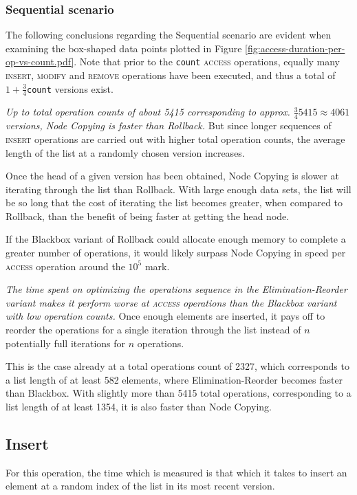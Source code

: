 \subsubsection{Sequential scenario}
The following conclusions regarding the Sequential scenario are evident when
examining the box-shaped data points plotted in Figure
\ref{fig:access-duration-per-op-vs-count.pdf}. Note that prior to the
\texttt{count} \textsc{access} operations, equally many \textsc{insert},
\textsc{modify} and \textsc{remove} operations have been executed, and thus a
total of $1+\frac{3}{4}$\texttt{count} versions exist.

\textit{Up to total operation counts of about 5415 corresponding to approx.
$\frac{3}{4}5415 \approx 4061$ versions, Node Copying is faster than Rollback.}
But since longer sequences of \textsc{insert} operations are carried out with
higher total operation counts, the average length of the list at a randomly
chosen version increases.

Once the head of a given version has been obtained, Node Copying is slower at
iterating through the list than Rollback. With large enough data sets, the list
will be so long that the cost of iterating the list becomes greater, when
compared to Rollback, than the benefit of being faster at getting the head node.

If the Blackbox variant of Rollback could allocate enough memory to complete a
greater number of operations, it would likely surpass Node Copying in speed per
\textsc{access} operation around the $10^5$ mark.

\textit{The time spent on optimizing the operations sequence in the
Elimination-Reorder variant makes it perform worse at \textsc{access} operations
than the Blackbox variant with low operation counts.} Once enough elements are
inserted, it pays off to reorder the operations for a single iteration through
the list instead of $n$ potentially full iterations for $n$ operations.

This is the case already at a total operations count of 2327, which corresponds
to a list length of at least 582 elements, where Elimination-Reorder becomes
faster than Blackbox. With slightly more than 5415 total operations,
corresponding to a list length of at least 1354, it is also faster than Node
Copying.

\subsection{Insert}
For this operation, the time which is measured is that which it takes to insert
an element at a random index of the list in its most recent version.

